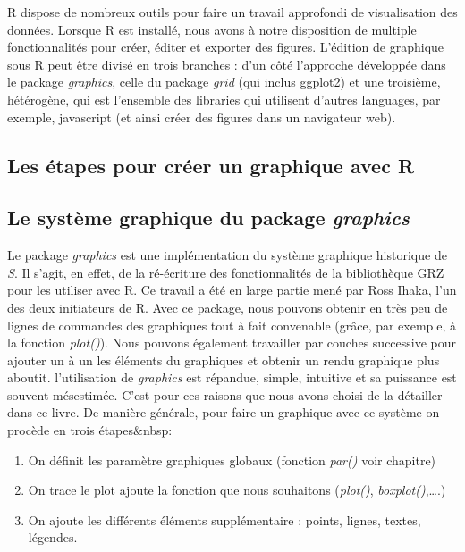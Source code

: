 \documentclass[]{article}
\providecommand{\tightlist}{%
  \setlength{\itemsep}{0pt}\setlength{\parskip}{0pt}}
\begin{document}
R dispose de nombreux outils pour faire un travail approfondi de visualisation
des données. Lorsque R est installé, nous avons à notre disposition de multiple
fonctionnalités pour créer, éditer et exporter des figures.
L'édition de graphique sous R peut être divisé en trois branches : d'un côté
l'approche développée dans le package \emph{graphics}, celle du package \emph{grid} (qui inclus ggplot2) et une troisième, hétérogène, qui est l'ensemble des libraries qui utilisent d'autres languages, par exemple, javascript (et ainsi créer des figures dans un navigateur web).

\hypertarget{les-uxe9tapes-pour-cruxe9er-un-graphique-avec-r}{%
\subsection{Les étapes pour créer un graphique avec R}\label{les-uxe9tapes-pour-cruxe9er-un-graphique-avec-r}}

\hypertarget{le-systuxe8me-graphique-du-package-graphics}{%
\subsection{\texorpdfstring{Le système graphique du package \emph{graphics}}{Le système graphique du package graphics}}\label{le-systuxe8me-graphique-du-package-graphics}}

Le package \emph{graphics} est une implémentation du système graphique historique de \emph{S}. Il s'agit, en effet, de la ré-écriture des fonctionnalités de la bibliothèque GRZ pour les utiliser avec R. Ce travail a été en large partie mené par Ross Ihaka, l'un des deux initiateurs de R. Avec ce package, nous pouvons obtenir en très peu de lignes de commandes des graphiques tout à fait convenable (grâce, par exemple, à la fonction \emph{plot()}). Nous pouvons également travailler par couches successive pour ajouter un à un les éléments du graphiques et obtenir un rendu graphique plus aboutit. l'utilisation de \emph{graphics} est répandue, simple, intuitive et sa puissance est souvent mésestimée. C'est pour ces raisons que nous avons choisi de la détailler dans ce livre. De manière générale, pour faire un graphique avec ce système on procède en trois étapes\&nbsp:

\begin{enumerate}
\def\labelenumi{\arabic{enumi}.}
\tightlist
\item
  On définit les paramètre graphiques globaux (fonction \emph{par()} voir chapitre)
\item
  On trace le plot ajoute la fonction que nous souhaitons (\emph{plot()}, \emph{boxplot()},\ldots{}.)
\item
  On ajoute les différents éléments supplémentaire : points, lignes, textes, légendes.
\end{enumerate}
\end{document}

